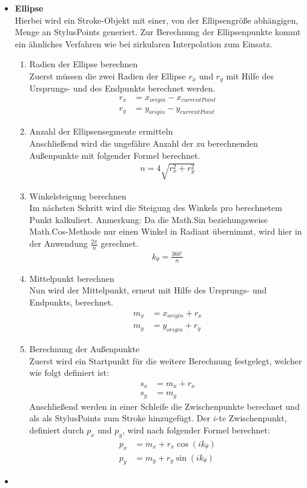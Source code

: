 \begin{itemize}
\item \textbf{Ellipse}\\ 
Hierbei wird ein Stroke-Objekt mit einer, von der Ellipsengröße abhängigen, Menge an StylusPoints generiert. Zur Berechnung der Ellipsenpunkte kommt ein ähnliches Verfahren wie bei zirkularen Interpolation zum Einsatz.
\begin{enumerate}
\item Radien der Ellipse berechnen\\
Zuerst müssen die zwei Radien der Ellipse $r_x$ und $r_y$ mit Hilfe des Ursprungs- und des Endpunkts berechnet werden.
\begin{align}
r_x &= x_{origin} - x_{currentPoint}\\
r_y &= y_{origin} - y_{currentPoint}
\end{align}
\item Anzahl der Ellipsensegmente ermitteln\\
Anschließend wird die ungefähre Anzahl der zu berechnenden Außenpunkte mit folgender Formel berechnet.
\begin{align}
n = 4 \sqrt{r_x^2+r_y^2}
\end{align}
\item Winkelsteigung berechnen\\
Im nächsten Schritt wird die Steigung des Winkels pro berechnetem Punkt kalkuliert.
Anmerkung: Da die Math.Sin beziehungsweise Math.Cos-Methode nur einen Winkel in Radiant übernimmt, wird hier in der Anwendung $\frac{2\pi}{n}$ gerechnet.
\begin{align}
k_{\theta} = \frac{360^\circ}{n}
\end{align}
\item Mittelpunkt berechnen\\
Nun wird der Mittelpunkt, erneut mit Hilfe des Ursprungs- und Endpunkts, berechnet.
\begin{align}
m_x &= x_{origin} + r_x\\
m_y &= y_{origin} + r_y
\end{align}
\item Berechnung der Außenpunkte\\
Zuerst wird ein Startpunkt für die weitere Berechnung festgelegt, welcher wie folgt definiert ist:
\begin{align}
s_x &= m_x + r_x\\
s_y &= m_y
\end{align}
Anschließend werden in einer Schleife die Zwischenpunkte berechnet und als als StylusPoints zum Stroke hinzugefügt. Der $i$-te Zwischenpunkt, definiert durch $p_x$ und $p_y$, wird nach folgender Formel berechnet:
\begin{align}
p_x &= m_x + r_x \cos(ik_\theta)\\
p_y &= m_y + r_y \sin(ik_\theta)
\end{align}
\end{enumerate}

\item
\end{itemize}
